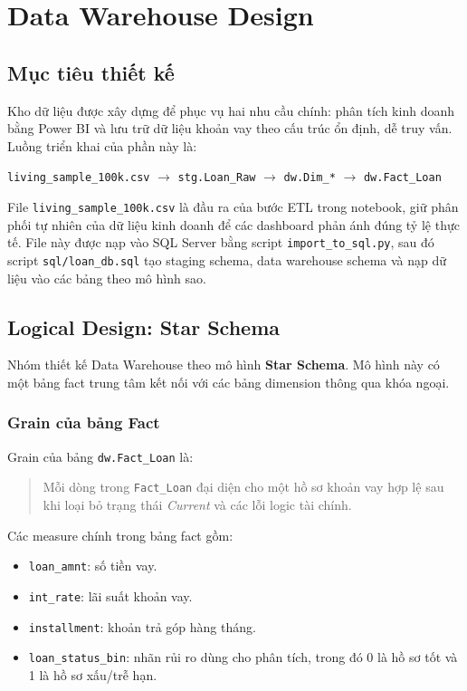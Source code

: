 \section{Data Warehouse Design}

\subsection{Mục tiêu thiết kế}
Kho dữ liệu được xây dựng để phục vụ hai nhu cầu chính: phân tích kinh doanh bằng Power BI và lưu trữ dữ liệu khoản vay theo cấu trúc ổn định, dễ truy vấn. Luồng triển khai của phần này là:

\begin{center}
\texttt{living\_sample\_100k.csv} $\rightarrow$ \texttt{stg.Loan\_Raw} $\rightarrow$ \texttt{dw.Dim\_*} $\rightarrow$ \texttt{dw.Fact\_Loan}
\end{center}

File \texttt{living\_sample\_100k.csv} là đầu ra của bước ETL trong notebook, giữ phân phối tự nhiên của dữ liệu kinh doanh để các dashboard phản ánh đúng tỷ lệ thực tế. File này được nạp vào SQL Server bằng script \texttt{import\_to\_sql.py}, sau đó script \texttt{sql/loan\_db.sql} tạo staging schema, data warehouse schema và nạp dữ liệu vào các bảng theo mô hình sao.

\subsection{Logical Design: Star Schema}
Nhóm thiết kế Data Warehouse theo mô hình \textbf{Star Schema}. Mô hình này có một bảng fact trung tâm kết nối với các bảng dimension thông qua khóa ngoại.

\subsubsection{Grain của bảng Fact}
Grain của bảng \texttt{dw.Fact\_Loan} là:

\begin{quote}
Mỗi dòng trong \texttt{Fact\_Loan} đại diện cho một hồ sơ khoản vay hợp lệ sau khi loại bỏ trạng thái \textit{Current} và các lỗi logic tài chính.
\end{quote}

Các measure chính trong bảng fact gồm:
\begin{itemize}
    \item \texttt{loan\_amnt}: số tiền vay.
    \item \texttt{int\_rate}: lãi suất khoản vay.
    \item \texttt{installment}: khoản trả góp hàng tháng.
    \item \texttt{loan\_status\_bin}: nhãn rủi ro dùng cho phân tích, trong đó 0 là hồ sơ tốt và 1 là hồ sơ xấu/trễ hạn.
\end{itemize}

